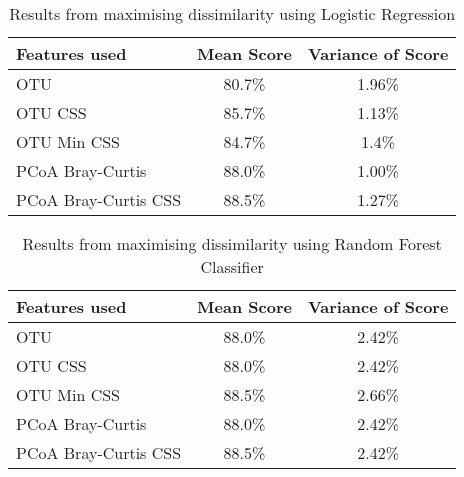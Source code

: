 \begin{table}[h]
\caption{Results from maximising dissimilarity using Logistic Regression}
\centering
\label{table:dissimilarity}
\begin{tabular}{l c  c}
\hline 
Features used & Mean Score & Variance of Score \\ 
 
\hline
OTU & 80.7\% & 1.96\%   \\
OTU CSS & 85.7\% & 1.13\%   \\
OTU Min CSS & 84.7\% & 1.4\%   \\
PCoA Bray-Curtis &88.0\% & 1.00\%   \\
PCoA Bray-Curtis CSS &88.5\% & 1.27\%   \\

\hline 
\end{tabular}
\end{table} 


\begin{table}[h]
	\caption{Results from maximising dissimilarity using Random Forest Classifier}
	\centering
	\label{table:dissimilarity}
	\begin{tabular}{l c  c}
		\hline 
		Features used & Mean Score & Variance of Score \\ 
		
		\hline
		OTU & 88.0\% & 2.42\%   \\
		OTU CSS & 88.0\% & 2.42\%   \\
		OTU Min CSS & 88.5\% & 2.66\%   \\
		PCoA Bray-Curtis &88.0\% & 2.42\%   \\
		PCoA Bray-Curtis CSS &88.5\% & 2.42\%   \\
		
		\hline 
	\end{tabular}
\end{table} 
